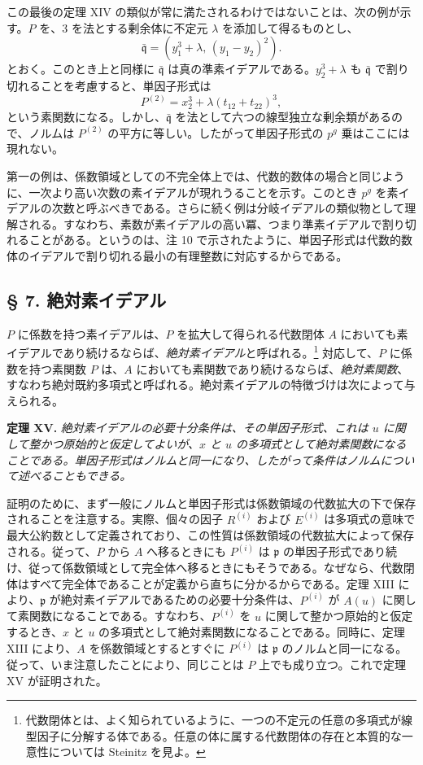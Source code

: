 \documentclass[11pt]{article}
\providecommand{\frakp}{\mathfrak p}
\providecommand{\frakq}{\mathfrak q}
\providecommand{\frakp}{\mathfrak p}
\providecommand{\frakq}{\mathfrak q}
\begin{document}
この最後の定理 XIV の類似が常に満たされるわけではないことは、次の例が示す。$P$ を、$3$ を法とする剰余体に不定元 $\lambda$ を添加して得るものとし、
\[
 \bar{\frakq}=(y_1^3+\lambda,\,(y_1-y_2)^2).
\]
とおく。このとき上と同様に $\bar{\frakq}$ は真の準素イデアルである。$y_2^3+\lambda$ も $\bar{\frakq}$ で割り切れることを考慮すると、単因子形式は
\[
 P^{(2)}=x_2^3+\lambda(t_{12}+t_{22})^3,
\]
という素関数になる。しかし、$\bar{\frakq}$ を法として六つの線型独立な剰余類があるので、ノルムは $P^{(2)}$ の平方に等しい。したがって単因子形式の $p^g$ 乗はここには現れない。

第一の例は、係数領域としての不完全体上では、代数的数体の場合と同じように、一次より高い次数の素イデアルが現れうることを示す。このとき $p^g$ を素イデアルの次数と呼ぶべきである。さらに続く例は分岐イデアルの類似物として理解される。すなわち、素数が素イデアルの高い冪、つまり準素イデアルで割り切れることがある。というのは、注 10 で示されたように、単因子形式は代数的数体のイデアルで割り切れる最小の有理整数に対応するからである。

\subsection*{§ 7. 絶対素イデアル}

$P$ に係数を持つ素イデアルは、$P$ を拡大して得られる代数閉体 $A$ においても素イデアルであり続けるならば、\emph{絶対素イデアル}と呼ばれる。\footnote{代数閉体とは、よく知られているように、一つの不定元の任意の多項式が線型因子に分解する体である。任意の体に属する代数閉体の存在と本質的な一意性については Steinitz を見よ。} 対応して、$P$ に係数を持つ素関数 $P$ は、$A$ においても素関数であり続けるならば、\emph{絶対素関数}、すなわち絶対既約多項式と呼ばれる。絶対素イデアルの特徴づけは次によって与えられる。

\textbf{定理 XV.} \emph{絶対素イデアルの必要十分条件は、その単因子形式、これは $u$ に関して整かつ原始的と仮定してよいが、$x$ と $u$ の多項式として絶対素関数になることである。単因子形式はノルムと同一になり、したがって条件はノルムについて述べることもできる。}

証明のために、まず一般にノルムと単因子形式は係数領域の代数拡大の下で保存されることを注意する。実際、個々の因子 $R^{(i)}$ および $E^{(i)}$ は多項式の意味で最大公約数として定義されており、この性質は\mbox{係数領域}の代数拡大によって保存される。従って、$P$ から $A$ へ移るときにも $P^{(i)}$ は $\frakp$ の単因子形式であり続け、従って係数領域として完全体へ移るときにもそうである。なぜなら、代数閉体はすべて完全体であることが定義から直ちに分かるからである。定理 XIII により、$\frakp$ が絶対素イデアルであるための必要十分条件は、$P^{(i)}$ が $A(u)$ に関して素関数になることである。すなわち、$P^{(i)}$ を $u$ に関して整かつ原始的と仮定するとき、$x$ と $u$ の多項式として絶対素関数になることである。同時に、定理 XIII により、$A$ を\mbox{係数領域}とするとすぐに $P^{(i)}$ は $\frakp$ のノルムと同一になる。従って、いま注意したことにより、同じことは $P$ 上でも成り立つ。これで定理 XV が証明された。
\end{document}
